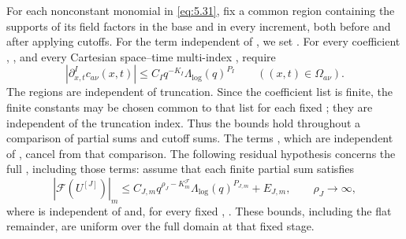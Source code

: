 For each nonconstant monomial in \eqref{eq:5.31}, fix a common region
 containing the supports of its field factors in the base and in
every increment, both before and after applying cutoffs. For the term independent of
, we set . For every coefficient
, , and every Cartesian
space--time multi-index , require
\begin{equation}
 |\partial_{x,t}^{I}c_{a\nu}(x,t)|
 \leq C_Iq^{-K_I}\Lambda_{\log}(q)^{P_I}
 \qquad ((x,t)\in\Omega_{a\nu}).
 \tag{5.32}\label{eq:5.32}
\end{equation}
The regions are independent of truncation. Since the coefficient list is finite, the finite constants
 may be chosen common to that list for each fixed
; they are independent of the truncation index. Thus the bounds hold
throughout a comparison of partial sums and cutoff sums. The terms
, which are independent of , cancel from that
comparison. The following residual hypothesis concerns the full ,
including those terms: assume that each finite partial sum satisfies
\begin{equation}
 |\mathcal F(U^{[J]})|_m
 \leq C_{J,m}q^{\rho_J-K_m^{\mathcal F}}\Lambda_{\log}(q)^{P_{J,m}}+E_{J,m},
 \qquad \rho_J\longrightarrow\infty,
 \tag{5.33}\label{eq:5.33}
\end{equation}
where  is independent of  and, for every fixed
,
. These bounds, including the flat remainder,
are uniform over the full domain at that fixed stage.


